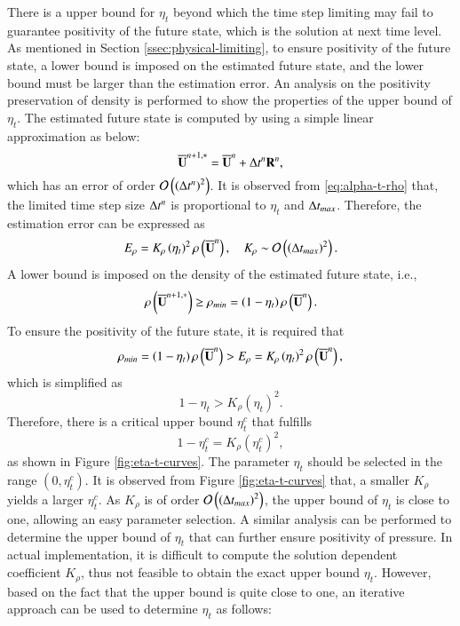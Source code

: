 There is a upper bound for $\eta_t$ beyond which the time step limiting may fail to guarantee positivity of the future state, which is the solution at next time level. As mentioned in Section \ref{ssec:physical-limiting}, to ensure positivity of the future state, a lower bound is imposed on the estimated future state, and the lower bound must be larger than the estimation error. An analysis on the positivity preservation of density is performed to show the properties of the upper bound of $\eta_t$. The estimated future state is computed by using a simple linear approximation as below:
\begin{equation} 
    \overline{\mathbf{U}}^{n+1,*}=\overline{\mathbf{U}}^n + \mathrm\Delta t^n \mathbf{R}^n,
\end{equation}
which has an error of order $\mathcal{O}\left(\left(\mathrm\Delta t^n\right)^2\right)$.
It is observed from \eqref{eq:alpha-t-rho} that, the limited time step size $\mathrm\Delta t^n$ is proportional to $\eta_t$ and $\mathrm\Delta t_{max}$. Therefore, the estimation error can be expressed as
\begin{equation}
    E_\rho= K_\rho \left(\eta_t\right)^2 \rho\left(\overline{\mathbf{U}}^n\right) , \quad K_\rho \sim \mathcal{O}\left(\left(\mathrm\Delta t_{max}\right)^2\right).
\end{equation}
A lower bound is imposed on the density of the estimated future state, i.e.,
\begin{equation}
    \rho\left(\overline{\mathbf{U}}^{n+1,*}\right) \geq \rho_{min}= \left(1-\eta_t\right) \rho\left(\overline{\mathbf{U}}^n\right).
\end{equation}
To ensure the positivity of the future state, it is required that
\begin{equation}
    \rho_{min}= \left(1-\eta_t\right) \rho\left(\overline{\mathbf{U}}^n\right) > E_\rho= K_\rho \left(\eta_t\right)^2 \rho\left(\overline{\mathbf{U}}^n\right),
\end{equation}
which is simplified as 
\begin{equation}
    1-\eta_t > K_\rho \left(\eta_t\right)^2.
\end{equation}
Therefore, there is a critical upper bound $\eta^c_t$ that fulfills 
\begin{equation}
    1-\eta^c_t = K_\rho \left(\eta^c_t\right)^2,
\end{equation}
as shown in Figure \ref{fig:eta-t-curves}.
The parameter $\eta_t$ should be selected in the range $\left(0,\eta^c_t\right)$. It  is observed from Figure \ref{fig:eta-t-curves} that, a smaller $K_\rho$ yields a larger $\eta^c_t$. As $K_\rho$ is of order $\mathcal{O}\left(\left(\mathrm\Delta t_{max}\right)^2\right)$, the upper bound of $\eta_t$ is close to one, allowing an easy parameter selection. A similar analysis can be performed to determine the upper bound of $\eta_t$ that can further ensure positivity of pressure. In actual implementation, it is difficult to compute the solution dependent coefficient $K_\rho$, thus not feasible to obtain the exact upper bound $\eta_t$. However, based on the fact that the upper bound is quite close to one, an iterative approach can be used to determine $\eta_t$ as follows:

